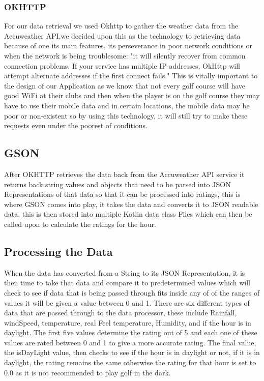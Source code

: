 \subsubsection{OKHTTP}
For our data retrieval we used Okhttp to gather the weather data from the Accuweather API,we decided upon this as the technology to retrieving data because of one its main features, its perseverance in poor network conditions or when the network is being troublesome: "it will silently recover from common connection problems. If your service has multiple IP addresses, OkHttp will attempt alternate addresses if the first connect fails."\cite{ref1}
\newline
\newline
This is vitally important to the design of our Application as we know that not every golf course will have good WiFi at their clubs and then when the player is on the golf course they may have to use their mobile data and in certain locations, the mobile data may be poor or non-existent so by using this technology, it will still try to make these requests even under the poorest of conditions.

\subsection{GSON}
After OKHTTP retrieves the data back from the Accuweather API service it returns back string values and objects that need to be parsed into JSON Representations of that data so that it can be processed into ratings, this is where GSON comes into play, it takes the data and converts it to JSON readable data, this is then stored into multiple Kotlin data class Files which can then be called upon to calculate the ratings for the hour.

\subsection {Processing the Data}
When the data has converted from a String to its JSON Representation, it is then time to take that data and compare it to predetermined values which will check to see if data that is being passed through fits inside any of of the ranges of values it will be given a value between 0 and 1.
\newline
\newline
There are six different types of data that are passed through to the data processor, these include Rainfall, windSpeed, temperature, real Feel temperature, Humidity, and if the hour is in daylight. The first five values determine the rating out of 5 and each one of these values are rated between 0 and 1 to give a more accurate rating. The final value, the isDayLight value, then checks to see if the hour is in daylight or not, if it is in daylight, the rating remains the same otherwise the rating for that hour is set to 0.0 as it is not recommended to play golf in the dark.

